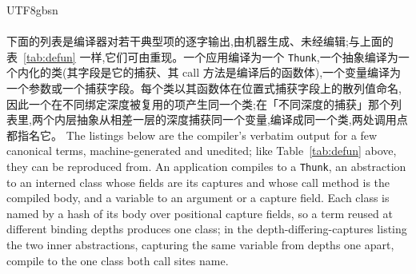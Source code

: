 \begin{CJK*}{UTF8}{gbsn}
  \paragraph{}\label{app:compiler-examples}
  \ifPaperChinese
  下面的列表是编译器对若干典型项的逐字输出,由机器生成、未经编辑;与上面的表~\ref{tab:defun} 一样,它们可由重现。一个应用编译为一个 \texttt{Thunk},一个抽象编译为一个内化的类(其字段是它的捕获、其 call 方法是编译后的函数体),一个变量编译为一个参数或一个捕获字段。每个类以其函数体在位置式捕获字段上的散列值命名,因此一个在不同绑定深度被复用的项产生同一个类;在「不同深度的捕获」那个列表里,两个内层抽象从相差一层的深度捕获同一个变量,编译成同一个类,两处调用点都指名它。
  \else
  The listings below are the compiler's verbatim output for a few canonical terms, machine-generated and unedited; like Table~\ref{tab:defun} above, they can be reproduced from. An application compiles to a \texttt{Thunk}, an abstraction to an interned class whose fields are its captures and whose call method is the compiled body, and a variable to an argument or a capture field. Each class is named by a hash of its body over positional capture fields, so a term reused at different binding depths produces one class; in the depth-differing-captures listing the two inner abstractions, capturing the same variable from depths one apart, compile to the one class both call sites name.
  \fi

  


\end{CJK*}
